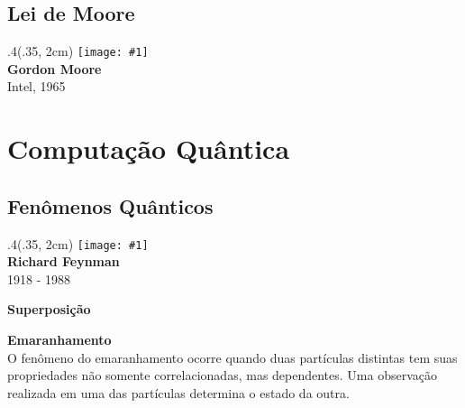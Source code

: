 \documentclass[t]{beamer}
\newcommand{\ket}[1]{\ensuremath{\left|#1\right\rangle}}
\newcommand{\comicfinal}[1]{
	\bgroup
	\usebackgroundtemplate{\texttt{[image: \#1]}}
	\begin{frame}[plain]{}

	\end{frame}
	\egroup
}
\newcommand{\person}[6]{%
\begin{textblock*}{#4}(#5, #6)
	\texttt{[image: \#1]}\\
	\textbf{#2}\\
	{\small #3}
\end{textblock*}
}
\DeclareRobustCommand{\mychar}[1]{%
  \begingroup\normalfont
  \texttt{[image: \#1]}%
  \endgroup
}
\begin{document}
		
	\subsection{Lei de Moore}
	
	\begin{frame}{\subsecname}
		\person{moore.jpg}{Gordon Moore}{Intel, 1965}{.4\paperwidth}{.35\paperwidth}{2cm}
	\end{frame}
	
	\comicfinal{moores-law.pdf}

	\section{Computação Quântica}
	
	\subsection{Fenômenos Quânticos}
	
	\begin{frame}{\subsecname}
		\person{feynman.jpg}{Richard Feynman}{1918 - 1988}{.4\paperwidth}{.35\paperwidth}{2cm}
	\end{frame}
	
	\begin{frame}{\subsecname}
		\textbf{Superposição}\\
		\vspace{2cm}
		\begin{overprint}
			\onslide<+>\resizebox{\textwidth}{!}{%
				$$\ket{\Psi} = \ket{\phantom{\Psi}} + \ket{\phantom{\Psi}}$$
			}%
			\onslide<+>\resizebox{\textwidth}{!}{%
				$$\ket{\Psi} = \ket{\uparrow} + \ket{\downarrow}$$
			}%
			\onslide<+>\resizebox{\textwidth}{!}{%
				$$\ket{\Psi} = \ket{\mychar{cara.pdf}} + \ket{\mychar{coroa.pdf}}$$
			}%
			\onslide<+>\resizebox{\textwidth}{!}{%
				$$\ket{\Psi} = \ket{\mychar{alive-cat.pdf}} + \ket{\mychar{dead-cat.pdf}}$$
			}%
			\onslide<+>\resizebox{\textwidth}{!}{%
				$$\ket{\Psi} = \ket{0} + \ket{1}$$
			}%
		\end{overprint}
	\end{frame}	
	
	\begin{frame}{\subsecname}
		\textbf{Emaranhamento}\\
		
		O fenômeno do emaranhamento ocorre quando duas partículas distintas tem suas propriedades não somente correlacionadas, mas dependentes. Uma observação realizada em uma das partículas determina o estado da outra.
	\end{frame}
	
\end{document}
